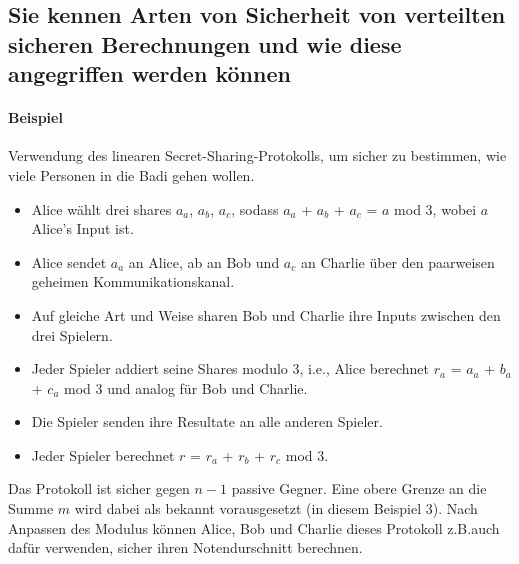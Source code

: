 \documentclass[10pt,a4paper]{article}
\begin{document}
\subsection*{Sie kennen Arten von Sicherheit von verteilten sicheren Berechnungen und wie diese angegriffen werden können}
\paragraph*{Beispiel}Verwendung des linearen Secret-Sharing-Protokolls, um sicher zu bestimmen, wie viele Personen in die Badi gehen wollen.
\begin{itemize}[noitemsep,topsep=0pt,leftmargin=*]
    \item Alice wählt drei shares $a_a$, $a_b$, $a_c$, sodass $a_a$ + $a_b$ + $a_c$ = $a$ mod 3, wobei $a$ Alice’s Input ist.
    \item Alice sendet $a_a$ an Alice, ab an Bob und $a_c$ an Charlie über den paarweisen geheimen Kommunikationskanal.
    \item Auf gleiche Art und Weise sharen Bob und Charlie ihre Inputs zwischen den drei Spielern.
    \item Jeder Spieler addiert seine Shares modulo 3, i.e., Alice berechnet $r_a$ = $a_a$ + $b_a$ + $c_a$ mod 3 und analog für Bob und Charlie.
    \item Die Spieler senden ihre Resultate an alle anderen Spieler.
    \item Jeder Spieler berechnet $r$ = $r_a$ + $r_b$ + $r_c$ mod 3.
\end{itemize}
Das Protokoll ist sicher gegen $n - 1$ passive Gegner. Eine obere Grenze an die Summe $m$ wird dabei als bekannt vorausgesetzt (in diesem Beispiel 3). Nach Anpassen des Modulus können Alice, Bob und Charlie dieses Protokoll z.B.auch dafür verwenden, sicher ihren Notendurschnitt berechnen.
\end{document}
